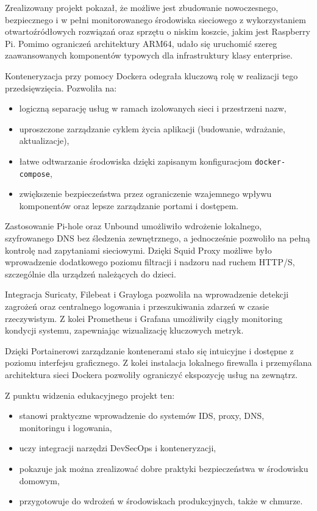 \documentclass[
    left=2.5cm,         %
    right=2.5cm,        %
    top=2.5cm,          %
    bottom=3cm,         %
    bindingoffset=6mm,  %
    nohyphenation=true %
]{eiti/eiti-thesis} %
\begin{document}
Zrealizowany projekt pokazał, że możliwe jest zbudowanie nowoczesnego, bezpiecznego i w pełni monitorowanego środowiska sieciowego z wykorzystaniem otwartoźródłowych rozwiązań oraz sprzętu o niskim koszcie, jakim jest Raspberry Pi. Pomimo ograniczeń architektury ARM64, udało się uruchomić szereg zaawansowanych komponentów typowych dla infrastruktury klasy enterprise.

Konteneryzacja przy pomocy Dockera odegrała kluczową rolę w realizacji tego przedsięwzięcia. Pozwoliła na:
\begin{itemize}
    \item logiczną separację usług w ramach izolowanych sieci i przestrzeni nazw,
    \item uproszczone zarządzanie cyklem życia aplikacji (budowanie, wdrażanie, aktualizacje),
    \item łatwe odtwarzanie środowiska dzięki zapisanym konfiguracjom \texttt{docker-compose},
    \item zwiększenie bezpieczeństwa przez ograniczenie wzajemnego wpływu komponentów oraz lepsze zarządzanie portami i dostępem.
\end{itemize}

Zastosowanie Pi-hole oraz Unbound umożliwiło wdrożenie lokalnego, szyfrowanego DNS bez śledzenia zewnętrznego, a jednocześnie pozwoliło na pełną kontrolę nad zapytaniami sieciowymi. Dzięki Squid Proxy możliwe było wprowadzenie dodatkowego poziomu filtracji i nadzoru nad ruchem HTTP/S, szczególnie dla urządzeń należących do dzieci.

Integracja Suricaty, Filebeat i Grayloga pozwoliła na wprowadzenie detekcji zagrożeń oraz centralnego logowania i przeszukiwania zdarzeń w czasie rzeczywistym. Z kolei Prometheus i Grafana umożliwiły ciągły monitoring kondycji systemu, zapewniając wizualizację kluczowych metryk.

Dzięki Portainerowi zarządzanie kontenerami stało się intuicyjne i dostępne z poziomu interfejsu graficznego. Z kolei instalacja lokalnego firewalla i przemyślana architektura sieci Dockera pozwoliły ograniczyć ekspozycję usług na zewnątrz.

Z punktu widzenia edukacyjnego projekt ten:
\begin{itemize}
    \item stanowi praktyczne wprowadzenie do systemów IDS, proxy, DNS, monitoringu i logowania,
    \item uczy integracji narzędzi DevSecOps i konteneryzacji,
    \item pokazuje jak można zrealizować dobre praktyki bezpieczeństwa w środowisku domowym,
    \item przygotowuje do wdrożeń w środowiskach produkcyjnych, także w chmurze.
\end{itemize}
\end{document}
